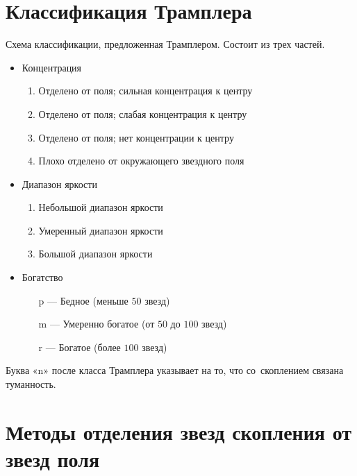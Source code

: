 \documentclass{beamer}
\begin{document}
    \section{Классификация Трамплера}
    \begin{frame}
        Схема классификации, предложенная Трамплером\cite{TrumpClass}. Состоит из трех частей.
        \begin{itemize}
            \item Концентрация
                \begin{enumerate}[I ---]
                    \item Отделено от поля; сильная концентрация к центру
                    \item Отделено от поля; слабая концентрация к центру
                    \item Отделено от поля; нет концентрации к центру
                    \item Плохо отделено от окружающего звездного поля
                \end{enumerate}
            \item Диапазон яркости
                \begin{enumerate}[1 ---]
                    \item Небольшой диапазон яркости
                    \item Умеренный диапазон яркости
                    \item Большой диапазон яркости
                \end{enumerate}
            \item Богатство
                \begin{enumerate}
                    \item[p ---] Бедное (меньше $50$ звезд)
                    \item[m ---] Умеренно богатое (от $50$ до $100$ звезд)
                    \item[r ---] Богатое (более $100$ звезд)
                \end{enumerate}
        \end{itemize}
        Буква «n» после класса Трамплера указывает на то, что со~скоплением связана туманность.
    \end{frame}

    \section{Методы отделения звезд скопления от звезд поля}
\end{document}
